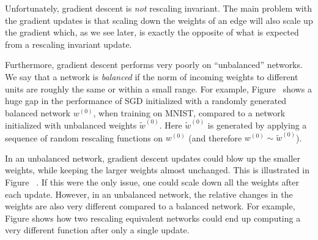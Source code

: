 \documentclass[11pt]{article}
\newcommand{\removed}[1]{}
\begin{document}
Unfortunately, gradient descent is {\em not} rescaling invariant. The main problem with the gradient updates is that scaling down the weights of an edge will also scale up the gradient which, as we see later, is exactly the opposite of what is expected from a rescaling invariant update. 

Furthermore, gradient descent performs very poorly on ``unbalanced''
networks.  We say that a network is {\em balanced} if the norm of
incoming weights to different units are roughly the same or within a
small range. For example, Figure~ shows a huge
gap in the performance of SGD initialized with a randomly generated
balanced network $w^{(0)}$, when training on MNIST, compared to a
network initialized with unbalanced weights $\tilde{w}^{(0)}$. Here
$\tilde{w}^{(0)}$ is generated by applying a sequence of random
rescaling functions on $w^{(0)}$ (and therefore $w^{(0)}\sim
\tilde{w}^{(0)}$).

In an unbalanced network, gradient descent updates could blow up the smaller weights, while keeping the larger weights almost unchanged. This is illustrated in Figure ~. If this were the only issue, one could scale down all the weights after each update. However, in an unbalanced network,  the relative changes in the weights are also very different compared to a balanced network. For example, Figure  shows how two rescaling equivalent networks could end up computing a very different function after only a single update.

\removed{The same problem exists in other optimization methods used in deep learning, including AdaGrad updates~\cite{adagrad}, where $\Delta w^{(t+1)}_e = -\eta \left(\partial L / \partial w_e^{(t)}\right)/\sqrt{\sum_{k=1}^t (\partial L / \partial w_e^{(k)})^2}$. In order to better understand and investigate this issue, we next discuss different scale measures for training neural networks.}
\end{document}
